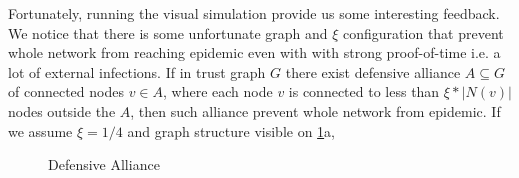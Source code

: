 \documentclass[nostrict]{szablonPG}
\begin{document}
Fortunately, running the visual simulation provide us some interesting feedback. We notice that there is some unfortunate graph and $\xi$ configuration that prevent whole network from reaching epidemic even with with strong proof-of-time i.e. a lot of external infections.
If in trust graph $G$ there exist defensive alliance $A \subseteq G$ of connected nodes $v \in A$, where each node $v$ is connected to less than $\xi * |N(v)|$ nodes outside the $A$, then such alliance prevent whole network from epidemic. If we assume $\xi = 1/4$ and graph structure visible on \ref{fig:defensive-alliance}a,
\begin{figure}[h!]
 \hfill 	
\caption{Defensive Alliance}
\label{fig:defensive-alliance}
\end{figure}
\end{document}
